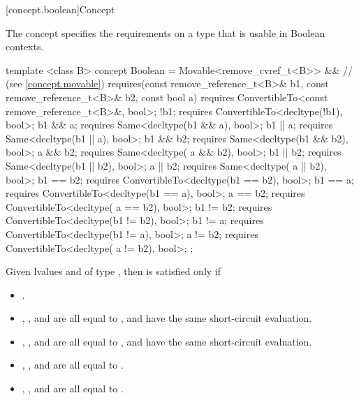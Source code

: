 [concept.boolean]{Concept }

\pnum
The  concept specifies the requirements on a type that is
usable in Boolean contexts.

%
\begin{itemdecl}
template <class B>
concept Boolean = Movable<remove_cvref_t<B>> && // (see \ref{concept.movable})
  requires(const remove_reference_t<B>& b1,
           const remove_reference_t<B>& b2, const bool a) {
    requires ConvertibleTo<const remove_reference_t<B>&, bool>;
    !b1;      requires ConvertibleTo<decltype(!b1), bool>;
    b1 &&  a; requires Same<decltype(b1 &&  a), bool>;
    b1 ||  a; requires Same<decltype(b1 ||  a), bool>;
    b1 && b2; requires Same<decltype(b1 && b2), bool>;
     a && b2; requires Same<decltype( a && b2), bool>;
    b1 || b2; requires Same<decltype(b1 || b2), bool>;
     a || b2; requires Same<decltype( a || b2), bool>;
    b1 == b2; requires ConvertibleTo<decltype(b1 == b2), bool>;
    b1 ==  a; requires ConvertibleTo<decltype(b1 ==  a), bool>;
     a == b2; requires ConvertibleTo<decltype( a == b2), bool>;
    b1 != b2; requires ConvertibleTo<decltype(b1 != b2), bool>;
    b1 !=  a; requires ConvertibleTo<decltype(b1 !=  a), bool>;
     a != b2; requires ConvertibleTo<decltype( a != b2), bool>;
  };
\end{itemdecl}

\pnum
Given lvalues  and  of type
,
then  is satisfied only if

\begin{itemize}
\item {}.
\item {}, , and
       are all equal to
      , and have the same short-circuit
      evaluation.
\item {}, , and
       are all equal to
      , and have the same short-circuit
      evaluation.
\item {}, , and
       are all equal to
      .
\item {}, , and
       are all equal to
      .
\end{itemize}

